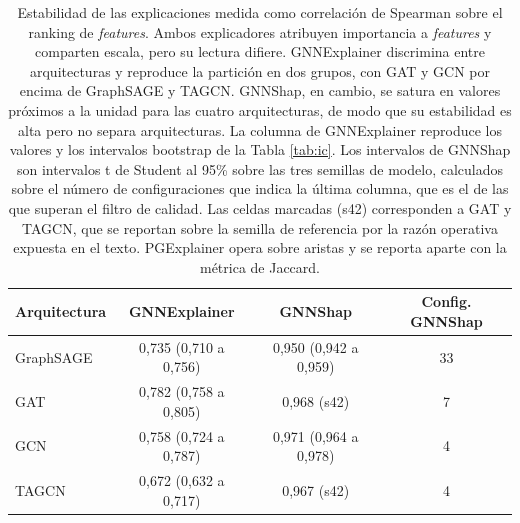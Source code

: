 \begin{table}[htbp]
\centering
\renewcommand{\arraystretch}{1.3}
\begin{tabular}{lccc}
\toprule
\textbf{Arquitectura} & \textbf{GNNExplainer} & \textbf{GNNShap} & \textbf{Config. GNNShap} \\
\midrule
GraphSAGE & 0,735 (0,710 a 0,756) & 0,950 (0,942 a 0,959) & 33 \\
GAT & 0,782 (0,758 a 0,805) & 0,968 (s42) & 7 \\
GCN & 0,758 (0,724 a 0,787) & 0,971 (0,964 a 0,978) & 4 \\
TAGCN & 0,672 (0,632 a 0,717) & 0,967 (s42) & 4 \\
\bottomrule
\end{tabular}
\caption{Estabilidad de las explicaciones medida como correlación de Spearman sobre el ranking de \textit{features}. Ambos explicadores atribuyen importancia a \textit{features} y comparten escala, pero su lectura difiere. GNNExplainer discrimina entre arquitecturas y reproduce la partición en dos grupos, con GAT y GCN por encima de GraphSAGE y TAGCN. GNNShap, en cambio, se satura en valores próximos a la unidad para las cuatro arquitecturas, de modo que su estabilidad es alta pero no separa arquitecturas. La columna de GNNExplainer reproduce los valores y los intervalos bootstrap de la Tabla \ref{tab:ic}. Los intervalos de GNNShap son intervalos t de Student al 95\% sobre las tres semillas de modelo, calculados sobre el número de configuraciones que indica la última columna, que es el de las que superan el filtro de calidad. Las celdas marcadas \textup{(s42)} corresponden a GAT y TAGCN, que se reportan sobre la semilla de referencia por la razón operativa expuesta en el texto. PGExplainer opera sobre aristas y se reporta aparte con la métrica de Jaccard.}
\label{tab:elliptic-robustez-3s}
\end{table}
